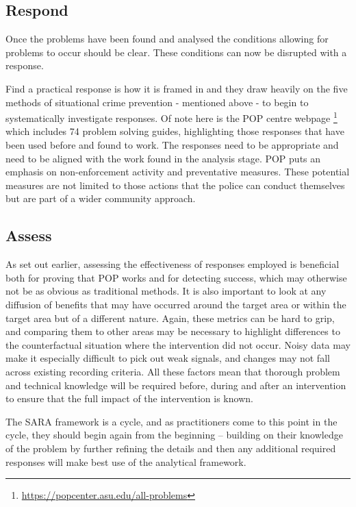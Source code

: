 \subsection{Respond} Once the problems have been found and analysed the conditions allowing for problems to occur should be clear. These conditions can now be disrupted with a response.

Find a practical response is how it is framed in   and they draw heavily on the five methods of situational crime prevention - mentioned  above - to begin to systematically investigate responses.  Of note here is the POP centre webpage \footnote{ \url{https://popcenter.asu.edu/all-problems} } which includes 74 problem solving guides, highlighting those responses that have been used before and found to work. The responses need to be appropriate and need to be aligned with the work found in the analysis stage. POP puts an emphasis on non-enforcement activity and preventative measures. These potential measures are not limited to those actions that the police can conduct themselves but are part of a wider community approach.

\subsection{Assess} As set out earlier, assessing the effectiveness of responses employed is beneficial both for proving that POP works and for detecting success, which may otherwise not be as obvious as traditional methods. It is also important to look at any diffusion of benefits that may have occurred around the target area or within the target area but of a different nature. Again, these metrics can be hard to grip, and comparing them to other areas may be necessary to highlight differences to the counterfactual situation where the intervention did not occur. Noisy data may make it especially difficult to pick out weak signals, and changes may not fall across existing recording criteria. All these factors mean that thorough problem and technical knowledge will be required before, during and after an intervention to ensure that the full impact of the intervention is known.

The SARA framework is a cycle, and as practitioners come to this point in the cycle, they should begin again from the beginning – building on their knowledge of the problem by further refining the details and then any additional required responses will make best use of the analytical framework.


